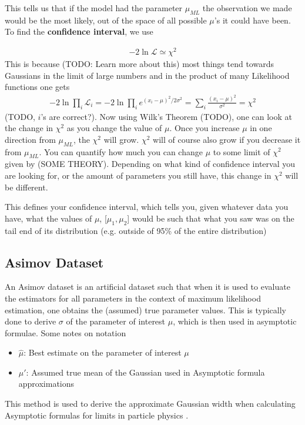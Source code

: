 
This tells us that if the model had the parameter $\mu_{ML}$ the observation we made would be the most likely, out of the space of all possible $\mu$'s it could have been. To find the \textbf{confidence interval}, we use

\begin{align}
-2\ln\mathcal{L} \simeq \chi^2
\end{align}
This is because (TODO: Learn more about this) most things tend towards Gaussians in the limit of large numbers and in the product of many Likelihood functions one gets
\begin{align}
	-2\ln\prod_i\mathcal{L}_i = -2\ln\prod_i e^{(x_i-\mu)^2/2\sigma^2} = \sum_i\frac{(x_i-\mu)^2}{\sigma^2} = \chi^2
\end{align}
(TODO, $i$'s are correct?). Now using Wilk's Theorem (TODO), one can look at the change in $\chi^2$ as you change the value of $\mu$. Once you increase $\mu$ in one direction from $\mu_{ML}$, the $\chi^2$ will grow. $\chi^2$ will of course also grow if you decrease it from $\mu_{ML}$. You can quantify how much you can change $\mu$ to some limit of $\chi^2$ given by (SOME THEORY). Depending on what kind of confidence interval you are looking for, or the amount of parameters you still have, this change in $\chi^2$ will be different. 

This defines your confidence interval, which tells you, given whatever data you have, what the values of $\mu$,  [$\mu_1, \mu_2$] would be such that what you saw was on the tail end of its distribution (e.g. outside of 95\% of the entire distribution)

\subsection{Asimov Dataset}
An Asimov dataset is an artificial dataset such that when it is used to evaluate the estimators for all parameters in the context of maximum likelihood estimation, one obtains the (assumed) true parameter values. This is typically done to derive $\sigma$ of the parameter of interest $\mu$, which is then used in asymptotic formulae. Some notes on notation
\begin{itemize}
	\item $\hat{\mu}$: Best estimate on the parameter of interest $\mu$
	\item $\mu'$: Assumed true mean of the Gaussian used in Asymptotic formula approximations
\end{itemize}
This method is used to derive the approximate Gaussian width when calculating Asymptotic formulas for limits in particle physics \cite{cowan}.



